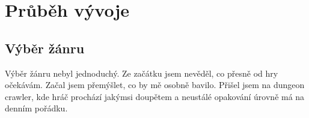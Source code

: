 \documentclass[12pt]{article}
\begin{document}
    \pagebreak
    
    \section{Průběh vývoje}
    \subsection{Výběr žánru}
        Výběr žánru nebyl jednoduchý. Ze začátku jsem nevěděl, co přesně od hry očekávám. Začal jsem přemýšlet, co by mě osobně bavilo. Přišel jsem na dungeon crawler, kde hráč prochází jakýmsi doupětem a neustálé opakování úrovně má na denním pořádku. \cite{website:wiki-dungeoncrawler}
    
    
    
    \nocite{*}
    \pagebreak
    \printbibliography
\end{document}
